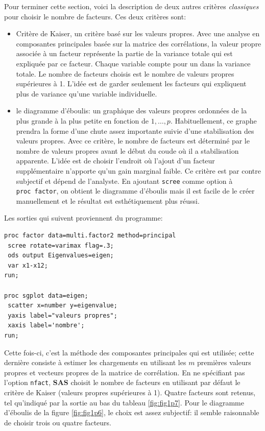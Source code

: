 \documentclass[
  11pt,
  letterpaper,
]{book}
\providecommand{\tightlist}{%
  \setlength{\itemsep}{0pt}\setlength{\parskip}{0pt}}
\theoremstyle{definition}
\theoremstyle{definition}
\theoremstyle{definition}
\theoremstyle{remark}
\begin{document}
Pour terminer cette section, voici la description de deux autres
critères \emph{classiques} pour choisir le nombre de facteurs. Ces deux critères sont:

\begin{itemize}
\tightlist
\item
  Critère de Kaiser, un critère basé sur les valeurs propres. Avec une analyse en composantes principales basée sur la matrice des corrélations, la valeur propre associée à un facteur représente la partie de la variance totale qui est expliquée par ce facteur. Chaque variable compte pour un dans la variance totale. Le nombre de facteurs choisis est le nombre de valeurs propres supérieures à 1. L'idée est de garder seulement les facteurs qui expliquent plus de variance qu'une variable individuelle.
\item
  le diagramme d'éboulis: un graphique des valeurs propres ordonnées de la plus grande à la plus petite en fonction de \(1, \ldots, p\). Habituellement, ce graphe prendra la forme d'une chute assez importante suivie d'une stabilisation des valeurs propres. Avec ce critère, le nombre de facteurs est déterminé par le nombre de valeurs propres avant le début du coude où il a stabilisation apparente. L'idée est de choisir l'endroit où l'ajout d'un facteur supplémentaire n'apporte qu'un gain marginal faible. Ce critère est par contre subjectif et dépend de l'analyste. En ajoutant \texttt{scree} comme option à \texttt{proc\ factor}, on obtient le diagramme d'éboulis mais il est facile de le créer manuellement et le résultat est esthétiquement plus réussi.
\end{itemize}

Les sorties qui suivent proviennent du programme:

\begin{verbatim}
proc factor data=multi.factor2 method=principal
 scree rotate=varimax flag=.3;
 ods output Eigenvalues=eigen;
 var x1-x12;
run; 

proc sgplot data=eigen;
 scatter x=number y=eigenvalue;
 yaxis label="valeurs propres";
 xaxis label='nombre';
run;
\end{verbatim}

Cette fois-ci, c'est la méthode des composantes principales qui est utilisée; cette dernière consiste à estimer les chargements en utilisant les \(m\) premières valeurs propres et vecteurs propres de la matrice de corrélation. En ne spécifiant pas l'option \texttt{nfact}, \textbf{SAS} choisit le nombre de facteurs en utilisant par défaut le critère de Kaiser (valeurs propres supérieures à 1). Quatre facteurs sont retenus, tel qu'indiqué par la sortie au bas du tableau \ref{fig:fig1p7}. Pour le diagramme d'éboulis de la figure \ref{fig:fig1p6}, le choix est assez subjectif: il semble raisonnable de choisir trois ou quatre facteurs.
\end{document}
